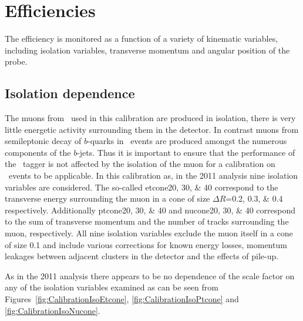 \section{Efficiencies} \label{sec:CalibrationEfficiencies}

The efficiency is monitored as a function of a variety of kinematic variables, including isolation variables, transverse momentum and angular position of the probe.

\subsection{Isolation dependence} \label{sec:CalibrationEfficienciesIsolation}

The muons from \jpsi\ used in this calibration are produced in isolation, there is very little energetic activity surrounding them in the detector. In contrast muons from semileptonic decay of $b$-quarks in \ttbar\ events are produced amongst the numerous components of the $b$-jets. Thus it is important to ensure that the performance of the \xsm\ tagger is not affected by the isolation of the muon for a calibration on \jpsi\ events to be applicable. In this calibration as, in the 2011 analysis nine isolation variables are considered. The so-called etcone\numlist{20;30;40} correspond to the transverse energy surrounding the muon in a cone of size $\Delta R$=\numlist{0.2;0.3;0.4} respectively. Additionally ptcone\numlist{20;30;40} and nucone\numlist{20;30;40} correspond to the sum of transverse momentum and the number of tracks surrounding the muon, respectively. All nine isolation variables exclude the muon itself in a cone of size 0.1 and include various corrections for known energy losses, momentum leakages between adjacent clusters in the detector and the effects of pile-up.

As in the 2011 analysis there appears to be no dependence of the scale factor on any of the isolation variables examined as can be seen from Figures~\ref{fig:CalibrationIsoEtcone}, \ref{fig:CalibrationIsoPtcone} and \ref{fig:CalibrationIsoNucone}.

